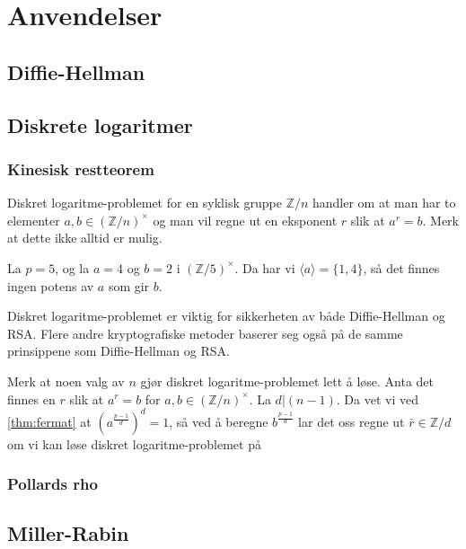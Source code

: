 \section{Anvendelser}

\subsection{Diffie-Hellman}

\subsection{Diskrete logaritmer}\label{sec:discrete-logarithms}
\subsubsection{Kinesisk restteorem}
Diskret logaritme-problemet for en syklisk gruppe $\mathbb Z / n$
handler om at man har to elementer $a, b\in (\mathbb Z / n)^\times$
og man vil regne ut en eksponent $r$ slik at $a^r = b$.
Merk at dette ikke alltid er mulig.
\begin{example}
    La $p = 5$, og la $a = 4$ og $b = 2$ i ${(\mathbb Z / 5)}^\times$.
    Da har vi $\langle a\rangle = \{1, 4\}$,
    så det finnes ingen potens av $a$ som gir $b$.
\end{example}

Diskret logaritme-problemet er viktig for sikkerheten av både
Diffie-Hellman og RSA.
Flere andre kryptografiske metoder baserer seg også på de samme prinsippene
som Diffie-Hellman og RSA.

Merk at noen valg av $n$ gjør diskret logaritme-problemet lett å løse.
Anta det finnes en $r$ slik at $a^r = b$ for $a,b\in {(\mathbb Z / n)}^\times$.
La $d | (n - 1)$.
Da vet vi ved \cref{thm:fermat} at $\left(a^{\frac{p - 1} d}\right)^d = 1$,
så ved å beregne $b^{\frac {p - 1} d}$ lar det oss regne ut
$\bar r\in \mathbb Z / d$ om vi kan løse diskret logaritme-problemet
på
\subsubsection{Pollards rho}
\subsection{Miller-Rabin}
